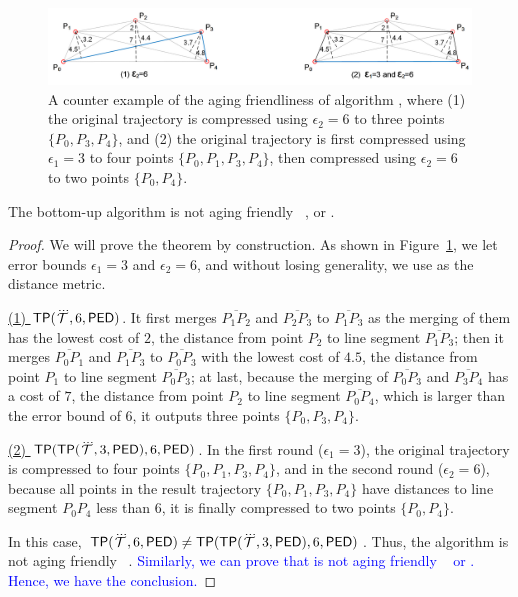 \begin{figure}
	\centering
	\includegraphics[scale=0.66]{Figures/Fig-aging-pavlidis.png}

	\caption{\small A counter example of the aging friendliness of algorithm \tpa, where (1) the original trajectory is compressed using $\epsilon_2=6$ to three points $\{P_0, P_3, P_4\}$, and (2) the original trajectory is first compressed using $\epsilon_1=3$ to four points $\{P_0, P_1, P_3, P_4\}$, then compressed using $\epsilon_2=6$ to two points $\{P_0, P_4\}$. }
	\vspace{-1ex}
	\label{fig:aging-pavlidis}
\end{figure}


\begin{theorem}
\label{theo-aging-tp}
The bottom-up algorithm \tpa is not aging friendly \wrt~\ped, \sed or \dad.
\end{theorem}

\begin{proof}
We will prove the theorem by construction.
As shown in Figure~\ref{fig:aging-pavlidis}, we let error bounds $\epsilon_1 =3$ and $\epsilon_2=6$, and without losing generality, we use \ped as the distance metric.

\underline{(1) ${{\mathsf{TP}}}(\dddot{\mathcal{T}}, 6, {\mathsf{PED}})$}. It first merges $\overline{P_1P_2}$ and $\overline{P_2P_3}$ to $\overline{P_1P_3}$ as the merging of them has the lowest cost of $2$, the distance from point $P_2$ to line segment $\overline{P_1P_3}$; then it merges $\overline{P_0P_1}$ and $\overline{P_1P_3}$ to $\overline{P_0P_3}$ with the lowest cost of $4.5$, the distance from point $P_1$ to line segment $\overline{P_0P_3}$; at last, because the merging of $\overline{P_0P_3}$ and $\overline{P_3P_4}$ has a cost of $7$, the distance from point $P_2$ to line segment $\overline{P_0P_4}$, which is larger than the error bound of $6$, it outputs three points $\{P_0, P_3, P_4\}$.

\underline{(2) ${{\mathsf{TP}}}({\mathsf{TP}}(\dddot{\mathcal{T}}, 3, {\mathsf{PED}}), 6, {\mathsf{PED}})$}. In the first round ($\epsilon_1=3$), the original trajectory is compressed to four points $\{P_0, P_1, P_3, P_4\}$, and in the second round ($\epsilon_2=6$), because all points in the result trajectory $\{P_0, P_1, P_3, P_4\}$ have distances to line segment $P_0P_4$ less than $6$, it is finally compressed to two points $\{P_0, P_4\}$.

In this case, ${{\mathsf{TP}}}(\dddot{\mathcal{T}}, 6, {\mathsf{PED}}) \ne {{\ensuremath {\mathsf{TP}}}}({\mathsf{TP}}(\dddot{\mathcal{T}}, 3, {\mathsf{PED}}), 6, {\mathsf{PED}})$. Thus, the \tpa algorithm is not aging friendly \wrt~\ped.
\textcolor{blue}{Similarly, we can prove that \tpa is not aging friendly \wrt~ \sed or \dad. Hence, we have the conclusion.}
\end{proof}

